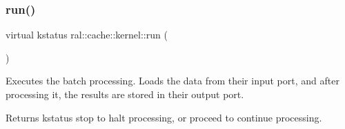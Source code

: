 \mbox{\label{classral_1_1cache_1_1kernel_a735b081cccae9574924e74ea6d293ef7}} 
\subsubsection{\texorpdfstring{run()}{run()}}
{\footnotesize\ttfamily virtual kstatus ral\+::cache\+::kernel\+::run (\begin{DoxyParamCaption}{ }\end{DoxyParamCaption})\hspace{0.3cm}{\ttfamily [pure virtual]}}



Executes the batch processing. Loads the data from their input port, and after processing it, the results are stored in their output port. 

\begin{DoxyReturn}{Returns}
kstatus \textquotesingle{}stop\textquotesingle{} to halt processing, or \textquotesingle{}proceed\textquotesingle{} to continue processing. 
\end{DoxyReturn}


